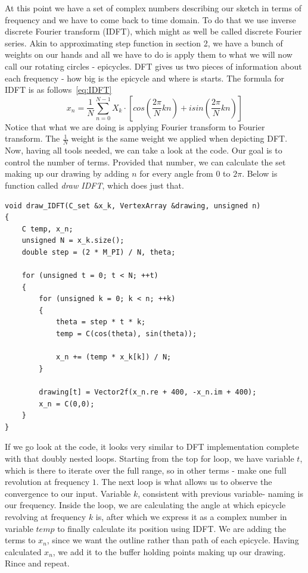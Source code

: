 \documentclass{article}
\begin{document}
    At this point we have a set of complex numbers describing our sketch in terms
    of frequency and we have to come back to time domain. To do that we use inverse
    discrete Fourier transform (IDFT), which might as well be called discrete 
    Fourier series. Akin to approximating step function in section 2, we have 
    a bunch of weights on our hands and all we have to do is apply them to what
    we will now call our rotating circles - epicycles. DFT gives us two pieces
    of information about each frequency - how big is the epicycle and where is
    starts. The formula for IDFT is as follows~\eqref{eq:IDFT}
    \begin{equation}\label{eq:IDFT}
        x_n = \frac{1}{N}\sum_{n=0}^{N-1}X_k \cdot \left[cos\left(\frac{2\pi}{N}kn\right) +
        isin\left(\frac{2\pi}{N}kn\right)\right]
    \end{equation}
    Notice that what we are doing is applying Fourier transform to Fourier transform.
    The $\frac{1}{N}$ weight is the same weight we applied when depicting DFT.
    Now, having all tools needed, we can take a look at the code. Our goal is to
    control the number of terms. Provided that number, we can calculate the set 
    making up our drawing by adding $n$ for every angle from $0$ to $2\pi$. 
    Below is function called \textit{draw IDFT}, which does just that.
    \begin{verbatim}
void draw_IDFT(C_set &x_k, VertexArray &drawing, unsigned n)
{
    C temp, x_n;
    unsigned N = x_k.size();
    double step = (2 * M_PI) / N, theta;

    for (unsigned t = 0; t < N; ++t)
    {
        for (unsigned k = 0; k < n; ++k)
        {
            theta = step * t * k;     
            temp = C(cos(theta), sin(theta));

            x_n += (temp * x_k[k]) / N;
        }

        drawing[t] = Vector2f(x_n.re + 400, -x_n.im + 400);
        x_n = C(0,0);
    }
}
    \end{verbatim}
    If we go look at the code, it looks very similar to DFT implementation complete
    with that doubly nested loops. Starting from the top for loop, we have variable
    $t$, which is there to iterate over the full range, so in other terms - make 
    one full revolution at frequency $1$. The next loop is what allows us to observe
    the convergence to our input. Variable $k$, consistent with previous variable-
    naming is our frequency. Inside the loop, we are calculating the angle at which
    epicycle revolving at frequency $k$ is, after which we express it as a complex
    number in variable $temp$ to finally calculate its position using IDFT. We
    are adding the terms to $x_n$, since we want the outline rather than path of 
    each epicycle. Having calculated $x_n$, we add it to the buffer holding points
    making up our drawing. Rince and repeat.
\end{document}
